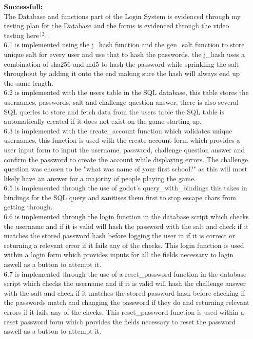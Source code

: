 \documentclass{article}
\begin{document}
        \textbf{Successfull:}\\
        The Database and functions part of the Login System is evidenced through my testing plan for the Database and the forms is evidenced through the video testing here$^{[2]}$.\\
        6.1 is implemented using the j\_hash function and the gen\_salt function to store unique salt for every user and use that to hash the passwords, the j\_hash uses a combination of sha256 and md5 to hash the password while sprinkling the salt throughout by adding it onto the end making sure the hash will always end up the same length.\\
        6.2 is implemented with the users table in the SQL database, this table stores the usernames, passwords, salt and challenge question answer, there is also several SQL queries to store and fetch data from the users table the SQL table is automatically created if it does not exist on the game starting up.\\
        6.3 is implemented with the create\_account function which validates unique usernames, this function is used with the create account form which provides a user input form to input the username, password, challenge question answer and confirm the password to create the account while displaying errors. The challenge question was chosen to be "what was name of your first school?" as this will most likely have an answer for a majority of people playing the game.\\
        6.5 is implemented through the use of godot's query\_with\_bindings this takes in bindings for the SQL query and sanitises them first to stop escape chars from getting through.\\
        6.6 is implemented through the login function in the database script which checks the username and if it is valid will hash the password with the salt and check if it matches the stored password hash before logging the user in if it is correct or returning a relevant error if it fails any of the checks. This login function is used within a login form which provides inputs for all the fields necessary to login aswell as a button to attempt it.\\
        6.7 is implemented through the use of a reset\_password function in the database script which checks the username and if it is valid will hash the challenge answer with the salt and check if it matches the stored password hash before checking if the passwords match and changing the password if they do and returning relevant errors if it fails any of the checks. This reset\_password function is used within a reset password form which provides the fields necessary to reset the password aswell as a button to attempt it.\\
\end{document}
